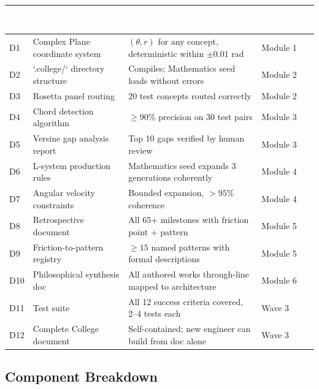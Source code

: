 \documentclass[11pt,letterpaper]{article}
\newcommand{\tableheader}[1]{\textbf{\sffamily\textcolor{white}{#1}}}
\begin{document}
\begin{center}
\begin{tabularx}{\textwidth}{C{0.8cm}L{4cm}L{4cm}X}
\toprule
{}
\tableheader{\#} & \tableheader{Deliverable} & \tableheader{Acceptance Criteria} & \tableheader{Spec Location} \\
\midrule
D1 & Complex Plane coordinate system & $(θ, r)$ for any concept, deterministic within $\pm 0.01$ rad & Module 1 \\
D2 & `.college/` directory structure & Compiles; Mathematics seed loads without errors & Module 2 \\
D3 & Rosetta panel routing & 20 test concepts routed correctly & Module 2 \\
D4 & Chord detection algorithm & $\geq 90\%$ precision on 30 test pairs & Module 3 \\
D5 & Versine gap analysis report & Top 10 gaps verified by human review & Module 3 \\
D6 & L-system production rules & Mathematics seed expands 3 generations coherently & Module 4 \\
D7 & Angular velocity constraints & Bounded expansion, $> 95\%$ coherence & Module 4 \\
D8 & Retrospective document & All 65+ milestones with friction point + pattern & Module 5 \\
D9 & Friction-to-pattern registry & $\geq 15$ named patterns with formal descriptions & Module 5 \\
D10 & Philosophical synthesis doc & All authored works through-line mapped to architecture & Module 6 \\
D11 & Test suite & All 12 success criteria covered, 2--4 tests each & Wave 3 \\
D12 & Complete College document & Self-contained; new engineer can build from doc alone & Wave 3 \\
\bottomrule
\end{tabularx}
\end{center}

\subsection{Component Breakdown}
\end{document}
